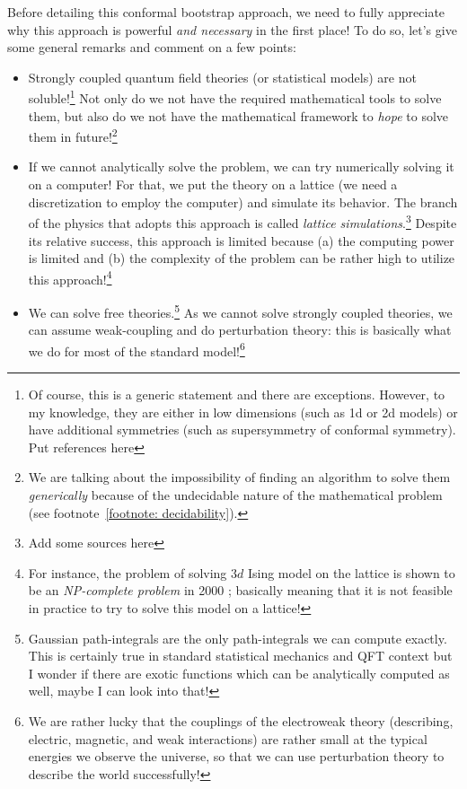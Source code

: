 \documentclass[12pt]{article}
\newcommand\draftnote[1]{{\color{blue} #1}}
\numberwithin{equation}{section}
\begin{document}
Before detailing this conformal bootstrap approach, we need to fully appreciate why this approach is powerful \emph{and necessary} in the first place! To do so, let's give some general remarks and comment on a few points:
\begin{itemize}
\label{items: problems with strongly coupled systems}
	\item Strongly coupled quantum field theories (or statistical models) are not soluble!\footnote{Of course, this is a generic statement and there are exceptions. However, to my knowledge, they are either in low dimensions (such as 1d or 2d models) or have additional symmetries (such as supersymmetry of conformal symmetry). \draftnote{Put references here}} Not only do we not have the required mathematical tools to solve them, but also do we not have the mathematical framework to \emph{hope} to solve them in future!\footnote{We are talking about the impossibility of finding an algorithm to solve them \emph{generically} because of the undecidable nature of the mathematical problem (see footnote~\ref{footnote: decidability}).}
	
	
	\item If we cannot analytically solve the problem, we can try numerically solving it on a computer! For that, we put the theory on a lattice (we need a discretization to employ the computer) and simulate its behavior. The branch of the physics that adopts this approach is called \emph{lattice simulations}.\footnote{\draftnote{Add some sources here}} Despite its relative success, this approach is limited because (a) the computing power is limited and (b) the complexity of the problem can be rather high to utilize this approach!\footnote{For instance, the problem of solving $3d$ Ising model on the lattice is shown to be an \emph{NP-complete problem} in 2000 \cite{istrail2000statistical}; basically meaning that it is not feasible in practice to try to solve this model on a lattice!}
	
	\item We can solve free theories.\footnote{Gaussian path-integrals are the only path-integrals we can compute exactly. \draftnote{This is certainly true in standard statistical mechanics and QFT context but I wonder if there are exotic functions which can be analytically computed as well, maybe I can look into that!}} As we cannot solve strongly coupled theories, we can assume weak-coupling and do perturbation theory: this is basically what we do for most of the standard model!\footnote{We are rather lucky that the couplings of the electroweak theory (describing, electric, magnetic, and weak interactions) are rather small at the typical energies we observe the universe, so that we can use perturbation theory to describe the world successfully! }
	

\end{itemize}
\end{document}
